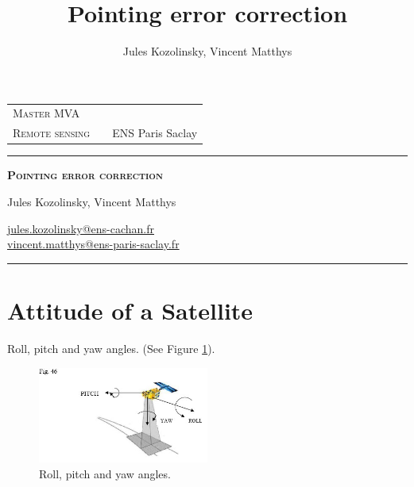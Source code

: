 \documentclass[paper=a4, fontsize=11pt, onecolumn, tikz, dvipsnames, svgnames, x11names]{article}
\title{\normalfont \normalsize \huge Pointing error correction}
\author{Jules Kozolinsky, Vincent Matthys}
\date{}
\begin{document}

 \begin{tabularx}{0.9\textwidth}{@{} l X r @{} }
 	{\textsc{Master MVA}}  &  & \textsc{} \\
 	\textsc{Remote sensing} &  & {ENS Paris Saclay}       \\
 \end{tabularx}
 \vspace{1.5cm}
 \begin{center}

 	\rule[11pt]{5cm}{0.5pt}

 	\textbf{\LARGE \textsc{Pointing error correction}}
 	\vspace{0.5cm}

 	Jules Kozolinsky,
 	Vincent Matthys

 	\href{mailto:jules.kozolinsky@ens-cachan.fr}{jules.kozolinsky@ens-cachan.fr} \\
 	\href{mailto:vincent.matthys@ens-paris-saclay.fr}{vincent.matthys@ens-paris-saclay.fr}

 	\rule{5cm}{0.5pt}

 	\vspace{1.5cm}
 \end{center}
 
 \tableofcontents
 
\begin{abstract}

\end{abstract}

\section{Attitude of a Satellite}


Roll, pitch and yaw angles. (See Figure \ref{angles}).

\begin{figure}[h]
    \centering
    \includegraphics[width=0.5\textwidth]{figures/angles.jpg}
   \caption{ Roll, pitch and yaw angles.}
   \label{angles}
\end{figure}
\end{document}
